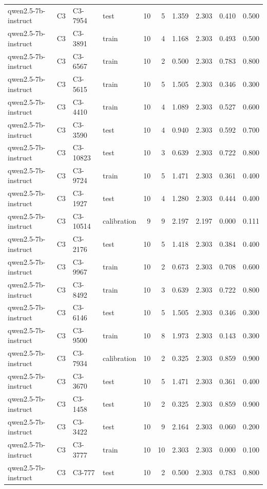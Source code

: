 \begin{table}
\begin{tabular}{llllrrrrrr}
qwen2.5-7b-instruct & C3 & C3-7954 & test & 10 & 5 & 1.359 & 2.303 & 0.410 & 0.500 \\
qwen2.5-7b-instruct & C3 & C3-3891 & train & 10 & 4 & 1.168 & 2.303 & 0.493 & 0.500 \\
qwen2.5-7b-instruct & C3 & C3-6567 & train & 10 & 2 & 0.500 & 2.303 & 0.783 & 0.800 \\
qwen2.5-7b-instruct & C3 & C3-5615 & train & 10 & 5 & 1.505 & 2.303 & 0.346 & 0.300 \\
qwen2.5-7b-instruct & C3 & C3-4410 & train & 10 & 4 & 1.089 & 2.303 & 0.527 & 0.600 \\
qwen2.5-7b-instruct & C3 & C3-3590 & test & 10 & 4 & 0.940 & 2.303 & 0.592 & 0.700 \\
qwen2.5-7b-instruct & C3 & C3-10823 & test & 10 & 3 & 0.639 & 2.303 & 0.722 & 0.800 \\
qwen2.5-7b-instruct & C3 & C3-9724 & train & 10 & 5 & 1.471 & 2.303 & 0.361 & 0.400 \\
qwen2.5-7b-instruct & C3 & C3-1927 & test & 10 & 4 & 1.280 & 2.303 & 0.444 & 0.400 \\
qwen2.5-7b-instruct & C3 & C3-10514 & calibration & 9 & 9 & 2.197 & 2.197 & 0.000 & 0.111 \\
qwen2.5-7b-instruct & C3 & C3-2176 & test & 10 & 5 & 1.418 & 2.303 & 0.384 & 0.400 \\
qwen2.5-7b-instruct & C3 & C3-9967 & train & 10 & 2 & 0.673 & 2.303 & 0.708 & 0.600 \\
qwen2.5-7b-instruct & C3 & C3-8492 & train & 10 & 3 & 0.639 & 2.303 & 0.722 & 0.800 \\
qwen2.5-7b-instruct & C3 & C3-6146 & test & 10 & 5 & 1.505 & 2.303 & 0.346 & 0.300 \\
qwen2.5-7b-instruct & C3 & C3-9500 & train & 10 & 8 & 1.973 & 2.303 & 0.143 & 0.300 \\
qwen2.5-7b-instruct & C3 & C3-7934 & calibration & 10 & 2 & 0.325 & 2.303 & 0.859 & 0.900 \\
qwen2.5-7b-instruct & C3 & C3-3670 & test & 10 & 5 & 1.471 & 2.303 & 0.361 & 0.400 \\
qwen2.5-7b-instruct & C3 & C3-1458 & test & 10 & 2 & 0.325 & 2.303 & 0.859 & 0.900 \\
qwen2.5-7b-instruct & C3 & C3-3422 & test & 10 & 9 & 2.164 & 2.303 & 0.060 & 0.200 \\
qwen2.5-7b-instruct & C3 & C3-3777 & train & 10 & 10 & 2.303 & 2.303 & 0.000 & 0.100 \\
qwen2.5-7b-instruct & C3 & C3-777 & test & 10 & 2 & 0.500 & 2.303 & 0.783 & 0.800 \\

\end{tabular}
\end{table}
